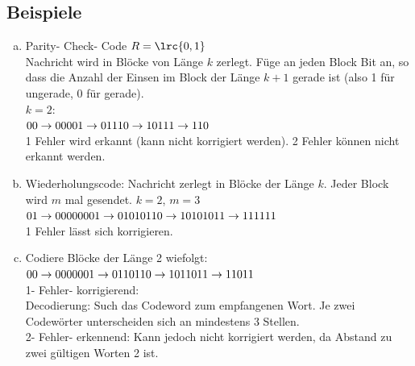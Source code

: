   \subsection{Beispiele}
    \begin{enumerate}[a)]
      \item Parity- Check- Code
        $R=\lrc{0,1}$\\
        Nachricht wird in Blöcke von Länge $k$ zerlegt. Füge an jeden Block Bit
        an, so dass die Anzahl der Einsen im Block der Länge $k+1$ gerade ist
        (also 1 für ungerade, 0 für gerade).\\
        $k=2$:\\
        $00\rightarrow 000\\
        01\rightarrow 011\\
        10\rightarrow 101\\
        11\rightarrow 110$\\
        1 Fehler wird erkannt (kann nicht korrigiert werden). 2 Fehler können
        nicht erkannt werden.
      \item Wiederholungscode: Nachricht zerlegt in Blöcke der Länge $k$. Jeder
        Block wird $m$ mal gesendet. $k=2$, $m=3$\\
        $01\rightarrow 000000\\
        01\rightarrow 010101\\
        10\rightarrow101010\\
        11\rightarrow111111$\\
        1 Fehler lässt sich korrigieren.
      \item Codiere Blöcke der Länge 2 wiefolgt:\\
        $00\rightarrow 00000\\
        01\rightarrow 01101\\
        10\rightarrow 10110\\
        11\rightarrow 11011$\\
        1- Fehler- korrigierend:\\
        Decodierung: Such das  Codeword zum empfangenen Wort. Je
        zwei\\Codewörter unterscheiden sich an mindestens 3 Stellen.\\
        2- Fehler- erkennend: Kann jedoch nicht korrigiert werden, da Abstand
        zu\\zwei gültigen Worten 2 ist.
    \end{enumerate}
